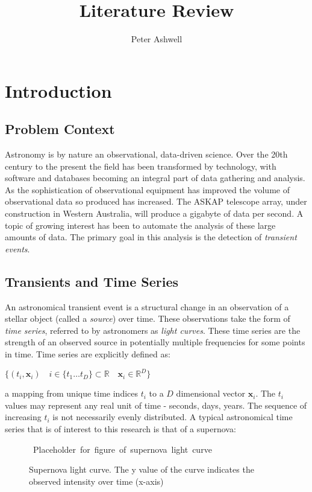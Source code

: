\documentclass[11pt]{article}
\title{Literature Review}
\author{Peter Ashwell}
\date{}
\begin{document}
	\maketitle
	\section{Introduction}
	\subsection{Problem Context}
	Astronomy is by nature an observational, data-driven science. Over the 20th century to the present the field has been transformed by technology, with software and databases becoming an integral part of data gathering and analysis. As the sophistication of observational equipment has improved the volume of observational data so produced has increased. The ASKAP telescope array, under construction in Western Australia, will produce a gigabyte of data per second. A topic of growing interest has been to automate the analysis of these large amounts of data. The primary goal in this analysis is the detection of \emph{transient events}.
	\subsection{Transients and Time Series}
	An astronomical transient event is a structural change in an observation of a stellar object (called a \emph{source}) over time. These observations take the form of \emph{time series}, referred to by astronomers as \emph{light curves}. These time series are the strength of an observed source in potentially multiple frequencies for some points in time. Time series are explicitly defined as:
	\begin{center}
	\begin{math}
		\{(t_i, \mathbf{x}_{i}) \quad i \in \{t_{1} \ldots t_{D}\} \subset \mathbb{R} \quad \mathbf{x}_{i} \in \mathbb{R}^{D} \}
	\end{math}
	\end{center}
	a mapping from unique time indices $t_{i}$ to a $D$ dimensional vector $\mathbf{x}_{i}$. The $t_{i}$ values may represent any real unit of time - seconds, days, years. The sequence of increasing $t_{i}$ is not necessarily evenly distributed. A typical astronomical time series that is of interest to this research is that of a supernova:
	\begin{figure}[h!]
	\centering
	\mbox{
	Placeholder for figure of supernova light curve
	}
	\caption{Supernova light curve. The y value of the curve indicates the observed intensity over time (x-axis)}
	\end{figure}
	
\end{document}
